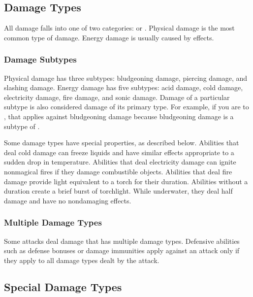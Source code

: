    \subsection{Damage Types}\label{Damage Types}
        All damage falls into one of two categories:  or .
        Physical damage is the most common type of damage.
        Energy damage is usually caused by  effects.

        \subsubsection{Damage Subtypes}\label{Damage Subtypes}
            Physical damage has three subtypes: bludgeoning damage, piercing damage, and slashing damage.
            Energy damage has five subtypes: acid damage, cold damage, electricity damage, fire damage, and sonic damage.
            Damage of a particular subtype is also considered damage of its primary type.
            For example, if you are  to , that applies against bludgeoning damage because bludgeoning damage is a subtype of .

            Some damage types have special properties, as described below.
             Abilities that deal cold damage can freeze liquids and have similar effects appropriate to a sudden drop in temperature.
             Abilities that deal electricity damage can ignite nonmagical fires if they damage combustible objects.
             Abilities that deal fire damage provide light equivalent to a torch for their duration.
            Abilities without a duration create a brief burst of torchlight.
            While underwater, they deal half damage and have no nondamaging effects.

        \subsubsection{Multiple Damage Types}\label{Multiple Damage Types}
            Some attacks deal damage that has multiple damage types.
            Defensive abilities such as defense bonuses or damage immunities apply against an attack only if they apply to all damage types dealt by the attack.

    \subsection{Special Damage Types}\label{Special Damage Types}

